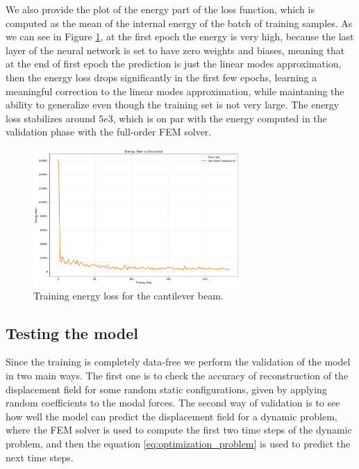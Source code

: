 We also provide the plot of the energy part of the loss function, which is computed as the mean of the internal energy of the batch of training samples. As we can see in Figure \ref{fig:training_energy_loss_beam}, at the first epoch the energy is very high, because the last layer of the neural network is set to have zero weights and biases, meaning that at the end of first epoch the prediction is just the linear modes approximation, then the energy loss drops significantly in the first few epochs, learning a meaningful correction to the linear modes approximation, while maintaning the ability to generalize even though the training set is not very large. The energy loss stabilizes around \(5e3\), which is on par with the energy computed in the validation phase with the full-order FEM solver.

\begin{figure}[ht]
    \centering
    \includegraphics[width=0.7\textwidth]{Images/training_energy_smoothed.png}
    \caption{Training energy loss for the cantilever beam.}
    \label{fig:training_energy_loss_beam}
\end{figure}


\subsection{Testing the model}
\label{sec:testing_model}
Since the training is completely data-free we perform the validation of the model in two main ways. The first one is to check the accuracy of reconstruction of the displacement field for some random static configurations, given by applying random coefficients to the modal forces. The second way of validation is to see how well the model can predict the displacement field for a dynamic problem, where the FEM solver is used to compute the first two time steps of the dynamic problem, and then the equation \ref{eq:optimization_problem} is used to predict the next time steps. 

